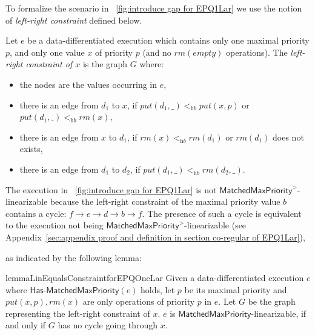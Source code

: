 To formalize the scenario in \figurename~\ref{fig:introduce gap for EPQ1Lar} we use the notion of \emph{left-right constraint} defined below.

\begin{definition}\label{def:left-right constraint for matched put and rm operations}
Let $e$ be a data-differentiated execution which contains only one maximal priority $p$, and only one value $x$ of priority $p$ (and no $\textit{rm}(\textit{empty})$ operations).
The \emph{left-right constraint of $x$} is the graph $G$ where: %
\begin{itemize}
\item the nodes are the values occurring in $e$, %
\item there is an edge from $d_1$ to $x$, if $\textit{put}(d_1,\_) <_{\textit{hb}} \textit{put}(x,p)$ or $\textit{put}(d_1,\_) <_{\textit{hb}} \textit{rm}(x)$,
\item there is an edge from $x$ to $d_1$, if $\textit{rm}(x)<_{\textit{hb}}\textit{rm}(d_1)$ or $\textit{rm}(d_1)$ does not exists,
\item there is an edge from $d_1$ to $d_2$, if $\textit{put}(d_1,\_) <_{\textit{hb}} \textit{rm}(d_2,\_)$.
\end{itemize}
\end{definition}

The execution in \figurename~\ref{fig:introduce gap for EPQ1Lar} is not $\mathsf{MatchedMaxPriority}^>$-linearizable because the left-right constraint of the maximal priority value $b$ contains a cycle: $f \rightarrow e \rightarrow d \rightarrow b \rightarrow f$. The presence of such a cycle is equivalent to the execution not being $\mathsf{MatchedMaxPriority}^>$-linearizable (see Appendix~\ref{sec:appendix proof and definition in section co-regular of EPQ1Lar}), {\color {red}as indicated by the following lemma:

\begin{restatable}{lemma}{LinEqualsConstraintforEPQOneLar}
\label{lemma:Lin Equals Constraint for EPQ1Lar}
Given a data-differentiated execution $e$ where $\mathsf{Has\text{-}MatchedMaxPriority}(e)$ holds, let $p$ be its maximal priority and $\textit{put}(x,p),\textit{rm}(x)$ are only operations of priority $p$ in $e$. Let $G$ be the graph representing the left-right constraint of $x$. $e$ is $\mathsf{MatchedMaxPriority}$-linearizable, if and only if $G$ has no cycle going through $x$.
\end{restatable}
}

